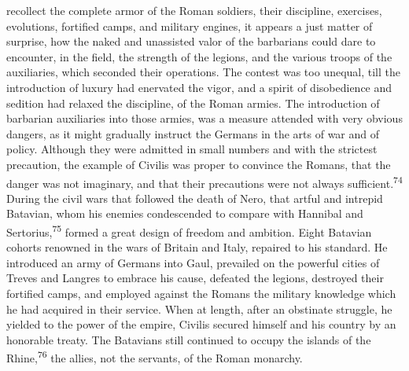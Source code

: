 recollect the complete armor of the Roman soldiers, their
discipline, exercises, evolutions, fortified camps, and military
engines, it appears a just matter of surprise, how the naked and
unassisted valor of the barbarians could dare to encounter, in
the field, the strength of the legions, and the various troops of
the auxiliaries, which seconded their operations. The contest was
too unequal, till the introduction of luxury had enervated the
vigor, and a spirit of disobedience and sedition had relaxed the
discipline, of the Roman armies. The introduction of barbarian
auxiliaries into those armies, was a measure attended with very
obvious dangers, as it might gradually instruct the Germans in
the arts of war and of policy. Although they were admitted in
small numbers and with the strictest precaution, the example of
Civilis was proper to convince the Romans, that the danger was
not imaginary, and that their precautions were not always
sufficient.\textsuperscript{74} During the civil wars that followed the death of
Nero, that artful and intrepid Batavian, whom his enemies
condescended to compare with Hannibal and Sertorius,\textsuperscript{75} formed a
great design of freedom and ambition. Eight Batavian cohorts
renowned in the wars of Britain and Italy, repaired to his
standard. He introduced an army of Germans into Gaul, prevailed
on the powerful cities of Treves and Langres to embrace his
cause, defeated the legions, destroyed their fortified camps, and
employed against the Romans the military knowledge which he had
acquired in their service. When at length, after an obstinate
struggle, he yielded to the power of the empire, Civilis secured
himself and his country by an honorable treaty. The Batavians
still continued to occupy the islands of the Rhine,\textsuperscript{76} the
allies, not the servants, of the Roman monarchy.





